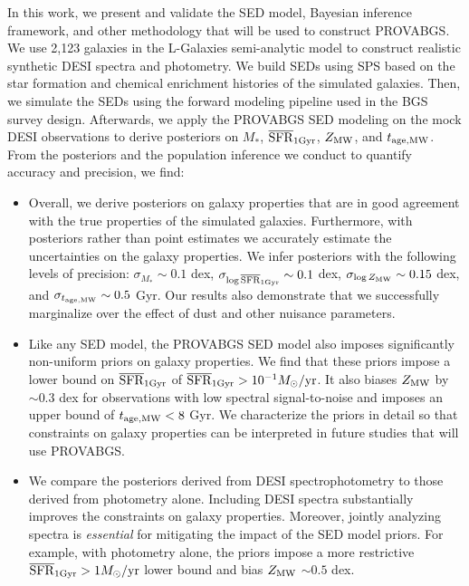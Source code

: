 In this work, we present and validate the SED model, Bayesian inference
framework, and other methodology that will be used to construct PROVABGS.
We use 2,123 galaxies in the {\sc L-Galaxies} semi-analytic model to construct
realistic synthetic DESI spectra and photometry.  
We build SEDs using SPS based on the star formation and chemical enrichment
histories of the simulated galaxies.
Then, we simulate the SEDs using the forward modeling pipeline used in the BGS
survey design.  
Afterwards, we apply the PROVABGS SED modeling on the mock DESI observations to
derive posteriors on $M_*$, $\overline{\rm SFR}_{\rm 1Gyr}$, $Z_{\rm MW}$, and $t_{\rm age, MW}$. 
From the posteriors and the population inference we conduct to quantify
accuracy and precision, we find: 
\begin{itemize}
    \item Overall, we derive posteriors on galaxy properties that are in good
        agreement with the true properties of the simulated galaxies. 
        Furthermore, with posteriors rather than point estimates we accurately
        estimate the uncertainties on the galaxy properties. 
        We infer posteriors with the following levels of precision: 
        $\sigma_{M_*}\sim0.1$ dex, $\sigma_{\log\overline{\rm SFR}_{\rm 1Gyr}}\sim0.1$ dex, 
        $\sigma_{\log Z_{\rm MW}}\sim0.15$ dex, and $\sigma_{t_{\rm age, MW}}\sim0.5$ Gyr. 
        Our results also demonstrate that we successfully marginalize over the
        effect of dust and other nuisance parameters. 
    \item Like any SED model, the PROVABGS SED model also imposes significantly
        non-uniform priors on galaxy properties. 
        We find that these priors impose a lower bound on $\overline{\rm SFR}_{\rm 1Gyr}$ of 
        $\overline{\rm SFR}_{\rm 1Gyr} > 10^{-1}M_\odot/{\rm yr}$. 
        It also biases $Z_{\rm MW}$ by ${\sim}0.3$ dex for observations with low
        spectral signal-to-noise and imposes an upper bound of $t_{\rm age, MW} < 8$ Gyr. 
        We characterize the priors in detail so that constraints on galaxy
        properties can be interpreted in future studies that will use PROVABGS.
    \item We compare the posteriors derived from DESI spectrophotometry to
        those derived from photometry alone. 
        Including DESI spectra substantially improves the constraints on galaxy
        properties. 
        Moreover, jointly analyzing spectra is {\em essential} for mitigating
        the impact of the SED model priors. 
        For example, with photometry alone, the priors impose a more
        restrictive $\overline{\rm SFR}_{\rm 1Gyr} > 1 M_\odot/{\rm yr}$ lower bound and bias $Z_{\rm MW}$
        ${\sim}0.5$ dex.
\end{itemize}

